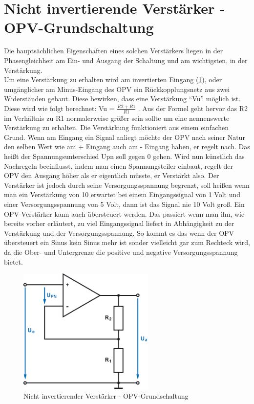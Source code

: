 \section{Nicht invertierende Verstärker - OPV-Grundschaltung}\label{sec:8.5}
Die hauptsächlichen Eigenschaften eines solchen Verstärkers liegen in der Phasengleichheit am Ein- und Ausgang der Schaltung und am wichtigsten, in der Verstärkung. \\
Um eine Verstärkung zu erhalten wird am invertierten Eingang (\ref{fig:8.5.1}), oder umgänglicher am Minus-Eingang des OPV ein Rückkopplungsnetz aus zwei Widerständen gebaut.
Diese bewirken, dass eine Verstärkung \enquote{Vu} möglich ist.
Diese wird wie folgt berechnet: Vu = $\frac{R2+R1}{R1}$ .
Aus der Formel geht hervor das R2 im Verhältnis zu R1 normalerweise größer sein sollte um eine nennenswerte Verstärkung zu erhalten.
Die Verstärkung funktioniert aus einem einfachen Grund.
Wenn am Eingang ein Signal anliegt möchte der OPV nach seiner Natur den selben Wert wie am + Eingang auch am - Eingang haben, er regelt nach.
Das heißt der Spannungsunterschied Upn soll gegen 0 gehen.
Wird nun künstlich das Nachregeln beeinflusst, indem man einen Spannungsteiler einbaut, regelt der OPV den Ausgang höher als er eigentlich müsste, er Verstärkt also.
Der Verstärker ist jedoch durch seine Versorgungsspannung begrenzt, soll heißen wenn man ein Verstärkung von 10 erwartet bei einem Eingangssignal von 1 Volt und einer Versorgungsspannung von 5 Volt, dann ist das Signal nie 10 Volt groß.
Ein OPV-Verstärker kann auch übersteuert werden.
Das passiert wenn man ihn, wie bereits vorher erläutert, zu viel Eingangssignal liefert in Abhängigkeit zu der Verstärkung und der Versorgungsspannung.
So kommt es das wenn der OPV übersteuert ein Sinus kein Sinus mehr ist sonder vielleicht gar zum Rechteck wird, da die Ober- und Untergrenze die positive und negative Versorgungsspannung bietet.
\begin{figure} [H]
	\centering	
	\includegraphics[width=0.6\textwidth]{img/Grundlagen/OPV-Verstaerker/OPV-VerstaerkerGrundschaltung.png}
	\caption[Nicht invertierender Verstärker - OPV-Grundschaltung]{Nicht invertierender Verstärker - OPV-Grundschaltung\footnotemark}
	\label {fig:8.5.1}
\end{figure}

